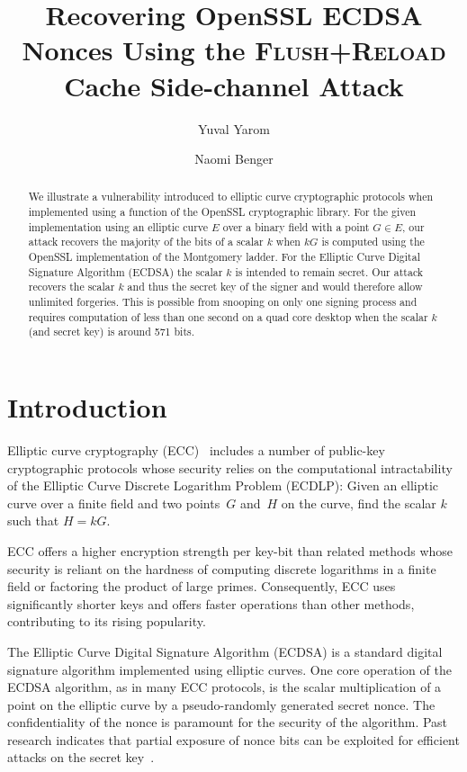 \documentclass[twocolumn]{svjour3}
\newcommand{\fl}{\textsc{Flu\-sh+\allowbreak Re\-load}\xspace}
\newcommand{\myupcase}[1]{\uppercase{#1}}
\begin{document}
\title{Recovering OpenSSL ECDSA Nonces Using the \fl Cache Side-channel Attack}
\author{Yuval Yarom \and Naomi Benger}

\maketitle

\begin{abstract}
We illustrate a vulnerability introduced to elliptic curve cryptographic protocols when implemented using a function of the OpenSSL cryptographic library.
For the given implementation using an elliptic curve $E$ over a binary field with a point $G\in E$, our attack recovers the majority of the bits of a scalar $k$ when $kG$ is computed using the OpenSSL implementation of the Montgomery ladder. 
For the Elliptic Curve Digital Signature Algorithm (\myupcase{ecdsa}) the scalar $k$ is intended to remain secret. 
Our attack recovers the scalar $k$ and thus the secret key of the signer and would therefore allow unlimited forgeries. 
This is possible from snooping on only one signing process and requires computation of less than one second on a quad core desktop when the scalar $k$ (and secret key) is around 571 bits.

\end{abstract}

\section{Introduction}
Elliptic curve cryptography (\myupcase{ecc})~\cite{miller85use,koblitz87elliptic} includes a number of public-key cryptographic protocols whose security relies on the computational intractability of the Elliptic Curve Discrete Logarithm Problem (\myupcase{ecdlp}): Given an elliptic curve over a finite field and two points~$G$ and~$H$ on the curve, find the scalar $k$ such that $H=kG$.

\myupcase{ecc} offers a higher encryption strength per key-bit than related methods whose security is reliant on the hardness of computing discrete logarithms in a finite field or factoring the product of large primes. Consequently, \myupcase{ecc} uses significantly shorter keys and offers faster operations than other methods, contributing to its rising popularity.

The Elliptic Curve Digital Signature Algorithm (\myupcase{ecdsa}) \cite{johnson01elliptic,fips,ansi962} is a standard
digital signature algorithm implemented using elliptic curves. One core operation of the \myupcase{ecdsa} algorithm, as in many \myupcase{ecc} protocols, is the scalar multiplication of a point on the elliptic curve by a pseudo-randomly generated secret nonce. The confidentiality of the nonce is paramount for the security of the algorithm. Past research indicates that partial exposure of nonce bits can be exploited for efficient attacks on the secret key~\cite{nguyen03insecurity,brumley11remote}.
\end{document}
